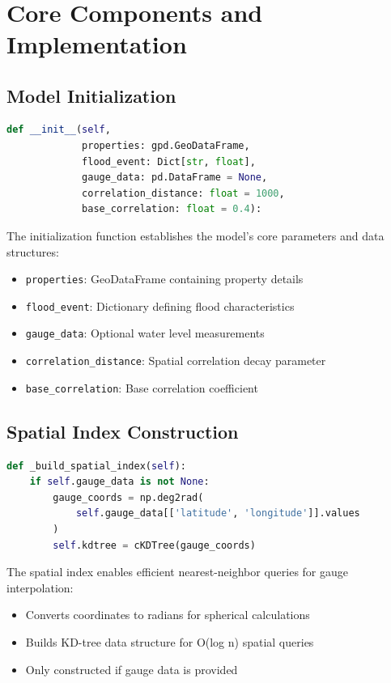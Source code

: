 \documentclass{article}
\begin{document}
\
\section{Core Components and Implementation}

\subsection{Model Initialization}
\begin{lstlisting}[language=Python]
def __init__(self, 
             properties: gpd.GeoDataFrame,
             flood_event: Dict[str, float],
             gauge_data: pd.DataFrame = None,
             correlation_distance: float = 1000,
             base_correlation: float = 0.4):
\end{lstlisting}

The initialization function establishes the model's core parameters and data structures:
\begin{itemize}
    \item \texttt{properties}: GeoDataFrame containing property details
    \item \texttt{flood\_event}: Dictionary defining flood characteristics
    \item \texttt{gauge\_data}: Optional water level measurements
    \item \texttt{correlation\_distance}: Spatial correlation decay parameter
    \item \texttt{base\_correlation}: Base correlation coefficient
\end{itemize}

\subsection{Spatial Index Construction}
\begin{lstlisting}[language=Python]
def _build_spatial_index(self):
    if self.gauge_data is not None:
        gauge_coords = np.deg2rad(
            self.gauge_data[['latitude', 'longitude']].values
        )
        self.kdtree = cKDTree(gauge_coords)
\end{lstlisting}

The spatial index enables efficient nearest-neighbor queries for gauge interpolation:
\begin{itemize}
    \item Converts coordinates to radians for spherical calculations
    \item Builds KD-tree data structure for O(log n) spatial queries
    \item Only constructed if gauge data is provided
\end{itemize}
\end{document}
